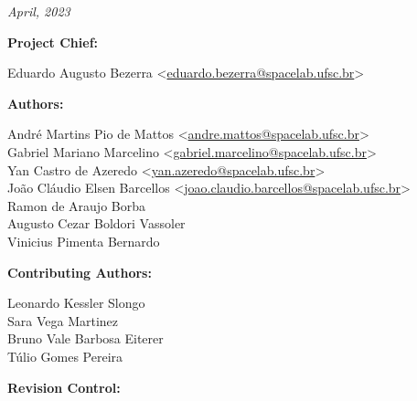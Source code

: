 %
%
%
%
%

%
%
%
%
%

\thispagestyle{empty}

\begin{center}

\textbf{\thetitle}

\textit{April, 2023}

\vspace{1cm}

\textbf{Project Chief:}

Eduardo Augusto Bezerra <\href{mailto:eduardo.bezerra@spacelab.ufsc.br}{eduardo.bezerra@spacelab.ufsc.br}>

\vspace{1cm}

\textbf{Authors:}

André Martins Pio de Mattos <\href{mailto:andre.mattos@spacelab.ufsc.br}{andre.mattos@spacelab.ufsc.br}>\\
Gabriel Mariano Marcelino <\href{mailto:gabriel.marcelino@spacelab.ufsc.br}{gabriel.marcelino@spacelab.ufsc.br}>\\
Yan Castro de Azeredo <\href{mailto:yan.azeredo@spacelab.ufsc.br}{yan.azeredo@spacelab.ufsc.br}>\\
João Cláudio Elsen Barcellos <\href{mailto:joao.claudio.barcellos@spacelab.ufsc.br}{joao.claudio.barcellos@spacelab.ufsc.br}>\\
Ramon de Araujo Borba\\
Augusto Cezar Boldori Vassoler \\ 
Vinicius Pimenta Bernardo \\

\vspace{1cm}

\textbf{Contributing Authors:}

Leonardo Kessler Slongo \\
Sara Vega Martinez \\
Bruno Vale Barbosa Eiterer \\
Túlio Gomes Pereira \\

\vspace{1cm}


\textbf{Revision Control:}

\end{center}

